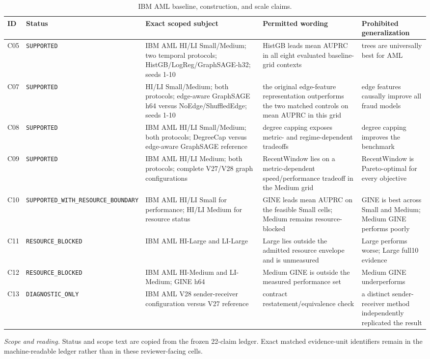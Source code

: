 \begin{table}[tbp]
\centering
\footnotesize
\setlength{\tabcolsep}{3.2pt}
\renewcommand{\arraystretch}{1.12}
\caption{IBM AML baseline, construction, and scale claims.}
\label{tab:s-claims-ibm}
\begin{tabularx}{\textwidth}{@{}l >{\raggedright\arraybackslash}p{} Y Y Y@{}}
\toprule
\textbf{ID} & \textbf{Status} & \textbf{Exact scoped subject} & \textbf{Permitted wording} & \textbf{Prohibited generalization} \\
\midrule
C05 & \texttt{SUPPORTED} & IBM AML HI/LI Small/Medium; two temporal protocols; HistGB/LogReg/GraphSAGE-h32; seeds 1-10 & HistGB leads mean AUPRC in all eight evaluated baseline-grid contexts & trees are universally best for AML \\
C07 & \texttt{SUPPORTED} & HI/LI Small/Medium; both protocols; edge-aware GraphSAGE h64 versus NoEdge/ShuffledEdge; seeds 1-10 & the original edge-feature representation outperforms the two matched controls on mean AUPRC in this grid & edge features causally improve all fraud models \\
C08 & \texttt{SUPPORTED} & IBM AML HI/LI Small/Medium; both protocols; DegreeCap versus edge-aware GraphSAGE reference & degree capping exposes metric- and regime-dependent tradeoffs & degree capping improves the benchmark \\
C09 & \texttt{SUPPORTED} & IBM AML HI/LI Medium; both protocols; complete V27/V28 graph configurations & RecentWindow lies on a metric-dependent speed/performance tradeoff in the Medium grid & RecentWindow is Pareto-optimal for every objective \\
C10 & \texttt{SUPPORTED\_\allowbreak{}WITH\_\allowbreak{}RESOURCE\_\allowbreak{}BOUNDARY} & IBM AML HI/LI Small for performance; HI/LI Medium for resource status & GINE leads mean AUPRC on the feasible Small cells; Medium remains resource-blocked & GINE is best across Small and Medium; Medium GINE performs poorly \\
C11 & \texttt{RESOURCE\_\allowbreak{}BLOCKED} & IBM AML HI-Large and LI-Large & Large lies outside the admitted resource envelope and is unmeasured & Large performs worse; Large full10 evidence \\
C12 & \texttt{RESOURCE\_\allowbreak{}BLOCKED} & IBM AML HI-Medium and LI-Medium; GINE h64 & Medium GINE is outside the measured performance set & Medium GINE underperforms \\
C13 & \texttt{DIAGNOSTIC\_\allowbreak{}ONLY} & IBM AML V28 sender-receiver configuration versus V27 reference & contract restatement/equivalence check & a distinct sender-receiver method independently replicated the result \\
\bottomrule
\end{tabularx}
\vspace{2pt}
\begin{minipage}{\textwidth}\footnotesize\emph{Scope and reading.} Status and scope text are copied from the frozen 22-claim ledger. Exact matched evidence-unit identifiers remain in the machine-readable ledger rather than in these reviewer-facing cells.\end{minipage}
\end{table}
